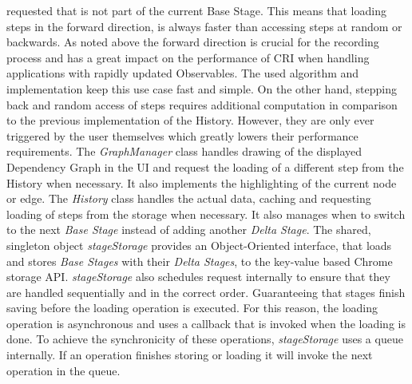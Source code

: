 requested that is not part of the current Base Stage. This means that loading steps in the forward direction, is always faster than accessing steps at random or backwards. As noted above the forward direction is crucial for the recording process and has a great impact on the performance of CRI when handling applications with rapidly updated Observables. The used algorithm and implementation keep this use case fast and simple. On the other hand, stepping back and random access of steps requires additional computation in comparison to the previous implementation of the History. However, they are only ever triggered by the user themselves which greatly lowers their performance requirements.
The \emph{GraphManager} class handles drawing of the displayed Dependency Graph in the UI and request the loading of a different step from the History when necessary. It also implements the highlighting of the current node or edge. The \emph{History} class handles the actual data, caching and requesting loading of steps from the storage when necessary. It also manages when to switch to the next \emph{Base Stage} instead of adding another \emph{Delta Stage}. The shared, singleton object \emph{stageStorage} provides an Object-Oriented interface, that loads and stores \emph{Base Stages} with their \emph{Delta Stages}, to the key-value based Chrome storage API. \emph{stageStorage} also schedules request internally to ensure that they are handled sequentially and in the correct order. Guaranteeing that stages finish saving before the loading operation is executed. For this reason, the loading operation is asynchronous and uses a callback that is invoked when the loading is done. To achieve the synchronicity of these operations, \emph{stageStorage} uses a queue internally. If an operation finishes storing or loading it will invoke the next operation in the queue.	
	
